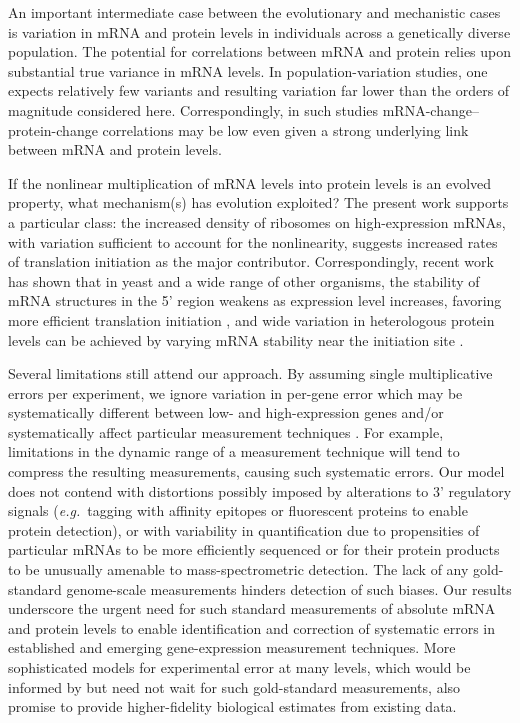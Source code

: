\documentclass[10pt]{article}
\newcommand{\eg}{\textit{e.g.}}
\begin{document}
An important intermediate case between the evolutionary and mechanistic cases is variation in mRNA and protein levels in individuals across a genetically diverse population. The potential for correlations between mRNA and protein relies upon substantial true variance in mRNA levels. In population-variation studies, one expects relatively few variants and resulting variation far lower than the orders of magnitude considered here. Correspondingly, in such studies mRNA-change--protein-change correlations may be low even given a strong underlying link between mRNA and protein levels.

If the nonlinear multiplication of mRNA levels into protein levels is an evolved property, what mechanism(s) has evolution exploited? The present work supports a particular class: the increased density of ribosomes on high-expression mRNAs, with variation sufficient to account for the nonlinearity, suggests increased rates of translation initiation as the major contributor. Correspondingly, recent work has shown that in yeast and a wide range of other organisms, the stability of mRNA structures in the 5' region weakens as expression level increases, favoring more efficient translation initiation \cite{gu10}, and wide variation in heterologous protein levels can be achieved by varying mRNA stability near the initiation site \cite{Goodman2013, Kudla2009}.

Several limitations still attend our approach. By assuming single
multiplicative errors per experiment, we ignore variation in per-gene error
which may be systematically different between low- and high-expression genes
and/or systematically affect particular measurement techniques
\cite{Ahrne2013}. For example, limitations in the dynamic range of a measurement technique will tend to compress the resulting measurements, causing such systematic errors. Our model does not contend with distortions
possibly imposed by alterations to 3' regulatory signals  (\eg~tagging with affinity epitopes \cite{ghaemmaghami03} or fluorescent proteins
\cite{newman06} to enable protein detection), or with variability in quantification due to
propensities of particular mRNAs to be more efficiently sequenced or for
their protein products to be unusually amenable to mass-spectrometric
detection. The lack of any gold-standard genome-scale measurements hinders
detection of such biases. Our results underscore the urgent need for such standard
measurements of absolute mRNA and protein levels to enable
identification and correction of systematic errors in established and emerging
gene-expression measurement techniques. More sophisticated models for experimental error at many levels, which would be informed by but need not wait for such gold-standard measurements, also promise to provide higher-fidelity biological estimates from existing data.
\end{document}
